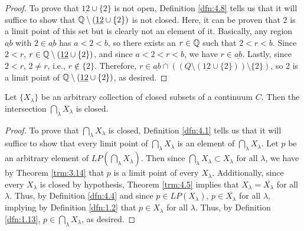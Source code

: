 \documentclass[../main.tex]{subfiles}
\begin{document}
\begin{exercise}
\begin{proof}
        To prove that $\underline{12}\cup\{2\}$ is not open, Definition \ref{dfn:4.8} tells us that it will suffice to show that $\mathbb{Q}\setminus(\underline{12}\cup\{2\})$ is not closed. Here, it can be proven that 2 is a limit point of this set but is clearly not an element of it. Basically, any region $\underline{ab}$ with $2\in\underline{ab}$ has $a<2<b$, so there exists an $r\in\mathbb{Q}$ such that $2<r<b$. Since $2<r$, $r\in\mathbb{Q}\setminus(\underline{12}\cup\{2\})$, and since $a<2<r<b$, we have $r\in\underline{ab}$. Lastly, since $2<r$, $2\neq r$, i.e., $r\notin\{2\}$. Therefore, $r\in\underline{ab}\cap((Q\setminus(\underline{12}\cup\{2\}))\setminus\{2\})$, so 2 is a limit point of $\mathbb{Q}\setminus(\underline{12}\cup\{2\})$, as desired.
    \end{proof}
\end{exercise}

\begin{theorem}\label{trm:4.16}
    Let $\{X_\lambda\}$ be an arbitrary collection of closed subsets of a continuum $C$. Then the intersection $\bigcap_\lambda X_\lambda$ is closed.
    \begin{proof}
        To prove that $\bigcap_\lambda X_\lambda$ is closed, Definition \ref{dfn:4.1} tells us that it will suffice to show that every limit point of $\bigcap_\lambda X_\lambda$ is an element of $\bigcap_\lambda X_\lambda$. Let $p$ be an arbitrary element of $LP\left( \bigcap_\lambda X_\lambda \right)$. Then since $\bigcap_\lambda X_\lambda\subset X_\lambda$ for all $\lambda$, we have by Theorem \ref{trm:3.14} that $p$ is a limit point of every $X_\lambda$. Additionally, since every $X_\lambda$ is closed by hypothesis, Theorem \ref{trm:4.5} implies that $X_\lambda=\overline{X_\lambda}$ for all $\lambda$. Thus, by Definition \ref{dfn:4.4} and since $p\in LP(X_\lambda)$, $p\in\overline{X_\lambda}$ for all $\lambda$, implying by Definition \ref{dfn:1.2} that $p\in X_\lambda$ for all $\lambda$. Thus, by Definition \ref{dfn:1.13}, $p\in\bigcap_\lambda X_\lambda$, as desired.
    \end{proof}
\end{theorem}
\end{document}

